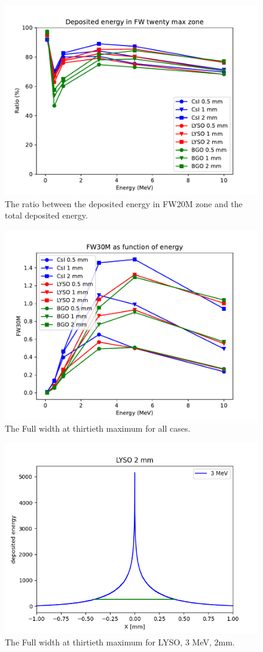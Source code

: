 \documentclass{article}
\begin{document}
\begin{figure}[H]
    \centering
    \includegraphics[width=0.8\linewidth]{images/task6/dep_twenty.pdf}
    \caption{The ratio between the deposited energy in FW20M zone and the total deposited energy.}
\end{figure}

 \begin{figure}[H]
    \centering
    \includegraphics[width=0.8\linewidth]{images/task6/FW30M_all.pdf}
    \caption{The Full width at thirtieth maximum for all cases. }
\end{figure}

 \begin{figure}[H]
    \centering
    \includegraphics[width=0.8\linewidth]{images/task6/Figure_1.png}
    \caption{The Full width at thirtieth maximum for LYSO, 3 MeV, 2mm. }
\end{figure}
\end{document}

